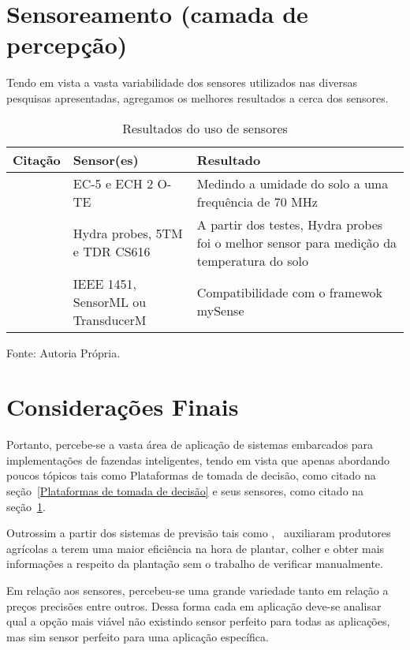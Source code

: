 \documentclass[
article,			%
12pt,				%
oneside,			%
a4paper,			%
english,			%
brazil,				%
sumario=tradicional
]{abntex2}
\begin{document}
\section{Sensoreamento (camada de percepção)}\label{Sensoreamento do solo (camada de percepção)}

Tendo em vista a vasta variabilidade dos sensores utilizados nas diversas pesquisas apresentadas, agregamos os melhores resultados a cerca dos sensores.

\clearpage
\begin{table}[!htb]
  \centering
  \caption{Resultados do uso de sensores}
  \begin{tabular}{|p{4.2cm}|p{4.2cm}|p{4.2cm}|}
    \hline
    \textbf{Citação} & \textbf{Sensor(es)}& \textbf{Resultado} \\ \hline
    \cite{3} & EC-5 e ECH 2 O-TE & Medindo a umidade do solo a uma frequência de 70 MHz \\ \hline
    \cite{12} & Hydra probes, 5TM e TDR CS616 & A partir dos testes, Hydra probes foi o melhor sensor para medição da temperatura do solo\\ \hline
    \cite{7} & IEEE 1451, SensorML ou TransducerM & Compatibilidade com o framewok mySense \\ \hline
  \end{tabular}

  {Fonte: Autoria Própria.}
\end{table}
\section{Considerações Finais}
Portanto, percebe-se a vasta área de aplicação de sistemas embarcados para implementações de fazendas inteligentes, tendo em vista que apenas abordando poucos tópicos tais como Plataformas de tomada de decisão, como citado na seção~\ref{Plataformas de tomada de decisão} e seus sensores, como citado na seção~\ref{Sensoreamento do solo (camada de percepção)}.

Outrossim a partir dos sistemas de previsão tais como \cite{1},~\cite{2} auxiliaram produtores agrícolas a terem uma maior eficiência na hora de plantar, colher e obter mais informações a respeito da plantação sem o trabalho de verificar manualmente.

Em relação aos sensores, percebeu-se uma grande variedade tanto em relação a preços precisões entre outros. Dessa forma cada em aplicação deve-se analisar qual a opção mais viável não existindo sensor perfeito para todas as aplicações, mas sim sensor perfeito para uma aplicação específica.

\postextual

\cleardoublepage


%
%
\end{document}
